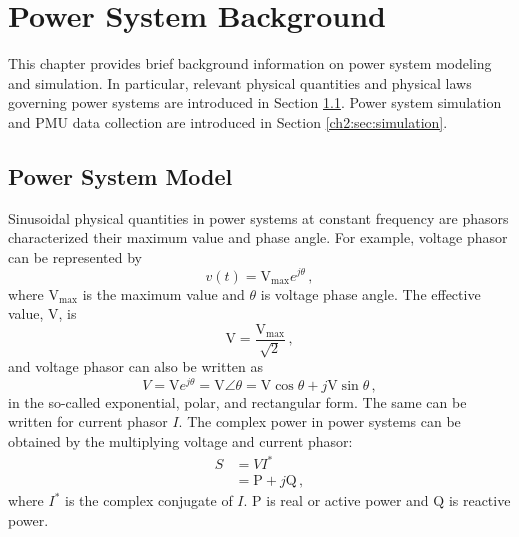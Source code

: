 
\chapter{Power System Background}
\label{ch:ps_background}
\vspace{2em}

This chapter provides brief background information on power system modeling and simulation. In particular, relevant physical quantities and physical laws governing power systems are introduced in Section \ref{ch2:sec:ps_model}. Power system simulation and PMU data collection are introduced in Section \ref{ch2:sec:simulation}.

\section{Power System Model}
\label{ch2:sec:ps_model}

Sinusoidal physical quantities in power systems at constant frequency are phasors characterized their maximum value and phase angle. For example, voltage phasor can be represented by
\begin{equation}
    v(t) = \text{V}_{\text{max}}e^{j\theta} \,,
\end{equation}
where $\text{V}_{\text{max}}$ is the maximum value and $\theta$ is voltage phase angle. The effective value, $\text{V}$, is 
\begin{equation}
    \text{V} = \frac{\text{V}_{\text{max}}}{\sqrt{2}} \,,
\end{equation}
and voltage phasor can also be written as 
\begin{equation}
    V = \text{V}e^{j\theta} = \text{V}\angle\theta = \text{V}\cos\theta + j\text{V}\sin\theta \,,
\end{equation}
in the so-called exponential, polar, and rectangular form. The same can be written for current phasor $I$. The complex power in power systems can be obtained by the multiplying voltage and current phasor:
\begin{align}
    S &= VI^* \\
      &= \text{P} + j\text{Q} \,,
\end{align}
where $I^*$ is the complex conjugate of $I$. $\text{P}$ is real or active power and $\text{Q}$ is reactive power. 

